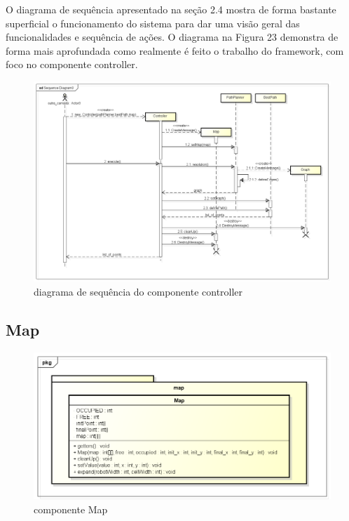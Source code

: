 O diagrama de sequência apresentado na seção 2.4 mostra de forma bastante superficial o funcionamento do sistema para dar uma visão geral das funcionalidades e sequência de ações. O diagrama na Figura 23 demonstra de forma mais aprofundada como realmente é feito o trabalho do framework, com foco no componente controller.

\begin{figure}[h]
	\centering
	\label{fig23}
		\includegraphics[keepaspectratio=true,scale=0.4]{figuras/executeController.png}
	\caption{diagrama de sequência do componente controller}
\end{figure}

\subsection{Map}

\begin{figure}[h]
	\centering
	\label{fig24}
		\includegraphics[keepaspectratio=true,scale=0.5]{figuras/pkgmap.png}
	\caption{componente Map}
\end{figure}

